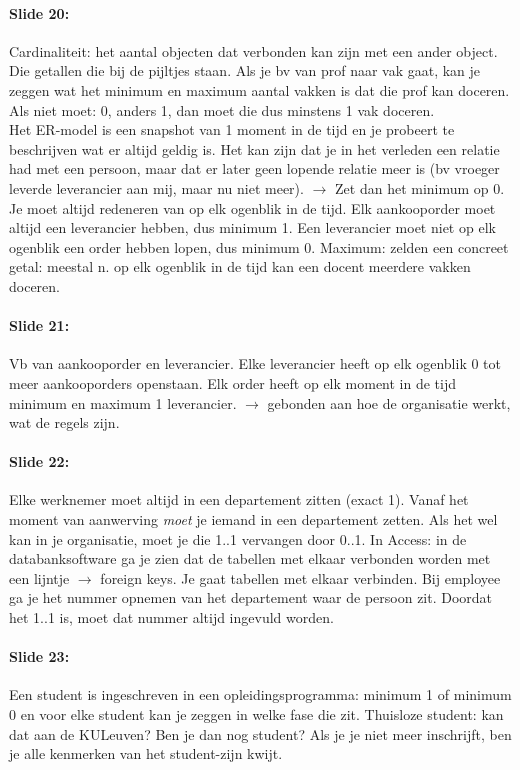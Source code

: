 \documentclass[10pt,a4paper]{report}
\begin{document}
\paragraph{Slide 20:}Cardinaliteit: het aantal objecten dat verbonden kan zijn met een ander object. Die getallen die bij de pijltjes staan. Als je bv van prof naar vak gaat, kan je zeggen wat het minimum en maximum aantal vakken is dat die prof kan doceren. Als niet moet: 0, anders 1, dan moet die dus minstens 1 vak doceren.\\
Het ER-model is een snapshot van 1 moment in de tijd en je probeert te beschrijven wat er altijd geldig is. Het kan zijn dat je in het verleden een relatie had met een persoon, maar dat er later geen lopende relatie meer is (bv vroeger leverde leverancier aan mij, maar nu niet meer). $\rightarrow$ Zet dan het minimum op 0. Je moet altijd redeneren van op elk ogenblik in de tijd. Elk aankooporder moet altijd een leverancier hebben, dus minimum 1. Een leverancier moet niet op elk ogenblik een order hebben lopen, dus minimum 0.
Maximum: zelden een concreet getal: meestal n. op elk ogenblik in de tijd kan een docent meerdere vakken doceren.

\paragraph{Slide 21:}Vb van aankooporder en leverancier. Elke leverancier heeft op elk ogenblik 0 tot meer aankooporders openstaan. Elk order heeft op elk moment in de tijd minimum en maximum 1 leverancier. $\rightarrow$ gebonden aan hoe de organisatie werkt, wat de regels zijn.

\paragraph{Slide 22:}Elke werknemer moet altijd in een departement zitten (exact 1). Vanaf het moment van aanwerving \emph{moet} je iemand in een departement zetten. Als het wel kan in je organisatie, moet je die 1..1 vervangen door 0..1.
In Access: in de databanksoftware ga je zien dat de tabellen met elkaar verbonden worden met een lijntje $\rightarrow$ foreign keys. Je gaat tabellen met elkaar verbinden. Bij employee ga je het nummer opnemen van het departement waar de persoon zit. Doordat het 1..1 is, moet dat nummer altijd ingevuld worden.

\paragraph{Slide 23:}Een student is ingeschreven in een opleidingsprogramma: minimum 1 of minimum 0 en voor elke student kan je zeggen in welke fase die zit. Thuisloze student: kan dat aan de KULeuven? Ben je dan nog student? Als je je niet meer inschrijft, ben je alle kenmerken van het student-zijn kwijt.
\end{document}
